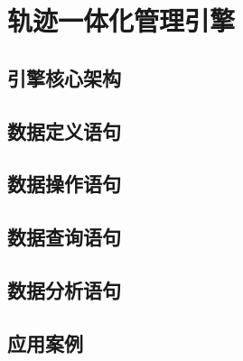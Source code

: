 \chapter{轨迹一体化管理引擎}
\section{引擎核心架构}
\section{数据定义语句}
\section{数据操作语句}
\section{数据查询语句}
\section{数据分析语句}
\section{应用案例}
